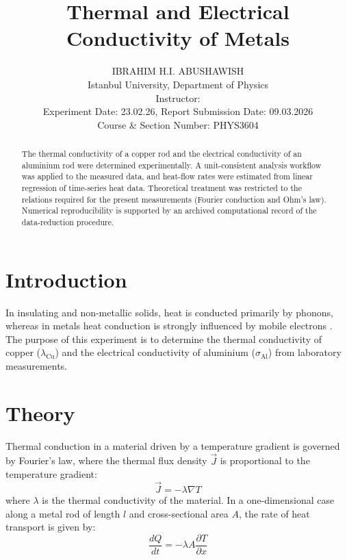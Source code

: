 \documentclass[journal]{IEEEtran}
\begin{document}
\title{Thermal and Electrical Conductivity of Metals}
\author{IBRAHIM H.I. ABUSHAWISH \\
Istanbul University, Department of Physics \\
Instructor: \hspace{4cm} \\
Experiment Date: 23.02.26, Report Submission Date: 09.03.2026\\
Course \& Section Number: PHYS3604}


\maketitle

\begin{abstract}
The thermal conductivity of a copper rod and the electrical conductivity of an
aluminium rod were determined experimentally. A unit-consistent analysis workflow
was applied to the measured data, and heat-flow rates were estimated from linear
regression of time-series heat data. Theoretical treatment was restricted to the
relations required for the present measurements (Fourier conduction and Ohm's law).
Numerical reproducibility is supported by an archived computational record of the
data-reduction procedure.
\end{abstract}

\section{Introduction}
In insulating and non-metallic solids, heat is conducted primarily by phonons, whereas in
metals heat conduction is strongly influenced by mobile electrons \cite{lab_manual}. The
purpose of this experiment is to determine the thermal conductivity of copper
($\lambda_{\text{Cu}}$) and the electrical conductivity of aluminium ($\sigma_{\text{Al}}$)
from laboratory measurements.

\section{Theory}
Thermal conduction in a material driven by a temperature gradient is governed by Fourier's law, where the thermal flux density $\vec{J}$ is proportional to the temperature gradient:
\begin{equation}
    \vec{J} = -\lambda \nabla T
\end{equation}
where $\lambda$ is the thermal conductivity of the material. In a one-dimensional case along a metal rod of length $l$ and cross-sectional area $A$, the rate of heat transport is given by:
\begin{equation}
    \frac{dQ}{dt} = -\lambda A \frac{\partial T}{\partial x}
\label{eq:heat_transport}
\end{equation}
\end{document}
